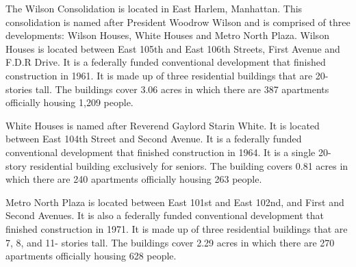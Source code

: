 The Wilson Consolidation is located in East Harlem, Manhattan. This consolidation is named after President Woodrow Wilson and is comprised of three developments: Wilson Houses, White Houses and Metro North Plaza. Wilson Houses is located between East 105th and East 106th Streets, First Avenue and F.D.R Drive. It is a federally funded conventional development that finished construction in 1961. It is made up of three residential buildings that are 20- stories tall. The buildings cover 3.06 acres in which there are 387 apartments officially housing 1,209 people. \par \vspace{.7\baselineskip}White Houses is named after Reverend Gaylord Starin White. It is located between East 104th Street and Second Avenue. It is a federally funded conventional development that finished construction in 1964. It is a single 20- story residential building exclusively for seniors. The building covers 0.81 acres in which there are 240 apartments officially housing 263 people. \par \vspace{.7\baselineskip}Metro North Plaza is located between East 101st and East 102nd, and First and Second Avenues. It is also a federally funded conventional development that finished construction in 1971. It is made up of three residential buildings that are 7, 8, and 11- stories tall. The buildings cover 2.29 acres in which there are 270  apartments officially housing 628  people.